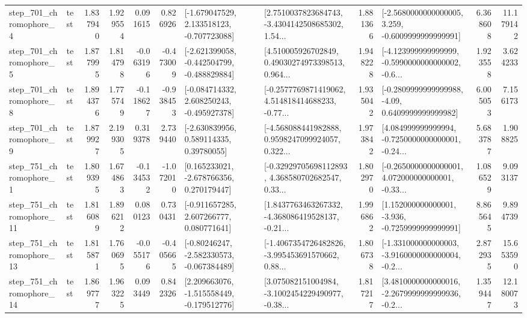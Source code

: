 \begin{tabular}{llrrrrllrlrr}
   step\_701\_chromophore\_4 &      test &      1.837940 &    1.929554 &      0.091615 &  0.826926 &   [-1.679047529, 2.133518123, -0.707723088] &  [2.7510037823684743, -3.4304142508685302, 1.54... &       1.881366 &  [-2.5680000000000005, 3.259, -0.6009999999999991] &            6.368608 &         11.179142 \\
   step\_701\_chromophore\_5 &      test &      1.877995 &    1.814798 &     -0.063196 & -0.473009 &  [-2.621399058, -0.442504799, -0.488829884] &  [4.510005926702849, 0.49030274973398513, 0.964... &       1.948228 &  [-4.123999999999999, -0.5990000000000002, -0.6... &            1.923558 &          3.624233 \\
   step\_701\_chromophore\_8 &      test &      1.894376 &    1.775749 &     -0.118627 & -0.938453 &   [-0.084714332, 2.608250243, -0.495927378] &  [-0.2577769871419062, 4.514818414688233, -0.77... &       1.935042 &   [-0.2809999999999988, -4.09, 0.6409999999999982] &            6.005053 &          7.156173 \\
   step\_701\_chromophore\_9 &      test &      1.879927 &    2.199305 &      0.319378 &  2.739440 &     [-2.630839956, 0.589114335, 0.39780055] &  [-4.568088441982888, 0.9598247099924057, 0.322... &       1.973842 &  [4.084999999999994, -0.7250000000000001, -0.24... &            5.683787 &          1.908825 \\
   step\_751\_chromophore\_1 &      test &      1.809395 &    1.674863 &     -0.134532 & -1.072010 &    [0.165233021, -2.678766356, 0.270179447] &  [-0.32929705698112893, 4.368580702682547, 0.33... &       1.802970 &  [-0.2650000000000001, 4.072000000000001, -0.33... &            1.086529 &          9.093137 \\
  step\_751\_chromophore\_11 &      test &      1.816089 &    1.896212 &      0.080123 &  0.730431 &    [-0.911657285, 2.607266777, 0.080771641] &  [1.8437763463267332, -4.368086419528137, -0.21... &       1.996862 &   [1.152000000000001, -3.936, -0.7259999999999991] &            8.865645 &          9.894739 \\
  step\_751\_chromophore\_13 &      test &      1.815871 &    1.760695 &     -0.055176 & -0.405665 &   [-0.80246247, -2.582330573, -0.067384489] &  [-1.4067354726482826, -3.995453691570662, 0.88... &       1.806738 &  [-1.331000000000003, -3.9160000000000004, -0.2... &            2.872935 &         15.653590 \\
  step\_751\_chromophore\_14 &      test &      1.869777 &    1.963225 &      0.093449 &  0.842326 &   [2.209663076, -1.515558449, -0.179512776] &  [3.075082151004984, -3.1002454229490977, -0.38... &       1.817217 &  [3.4810000000000016, -2.2679999999999936, -0.2... &            1.359447 &         12.180073 \\

\end{tabular}
